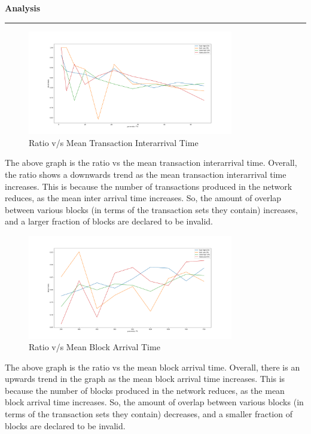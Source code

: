 \documentclass[a4paper,12pt]{article}
\newenvironment{solution}[2][]{%
\begin{mdframed}[linecolor=blue!70!black, linewidth=2pt, roundcorner=10pt, backgroundcolor=yellow!10!white, skipabove=12pt, skipbelow=12pt]%
	\textbf{\large #2}
	\par\noindent\rule{\textwidth}{0.4pt}
}{
\end{mdframed}
}
\begin{document}
\begin{solution}{Analysis}
	\begin{figure}[H]
		\centering
		\includegraphics[width=0.8\textwidth]{../images/avg_run_3/Ttx.png}
		\caption{Ratio v/s Mean Transaction Interarrival Time}
		\label{fig:simulation_plot4}
	\end{figure}

	The above graph is the ratio vs the mean transaction interarrival time. Overall, the ratio shows a downwards trend as the mean transaction interarrival time increases. This is because the number of transactions produced in the network reduces, as the mean inter arrival time increases. So, the amount of overlap between various blocks (in terms of the transaction sets they contain) increases, and a larger fraction of blocks are declared to be invalid.

	\begin{figure}[H]
		\centering
		\includegraphics[width=0.8\textwidth]{../images/avg_run_3/Tk.png}
		\caption{Ratio v/s Mean Block Arrival Time}
		\label{fig:simulation_plot5}
	\end{figure}

	The above graph is the ratio vs the mean block arrival time. Overall, there is an upwards trend in the graph as the mean block arrival time increases. This is because the number of blocks produced in the network reduces, as the mean block arrival time increases. So, the amount of overlap between various blocks (in terms of the transaction sets they contain) decreases, and a smaller fraction of blocks are declared to be invalid.	
	
\end{solution}
\end{document}
